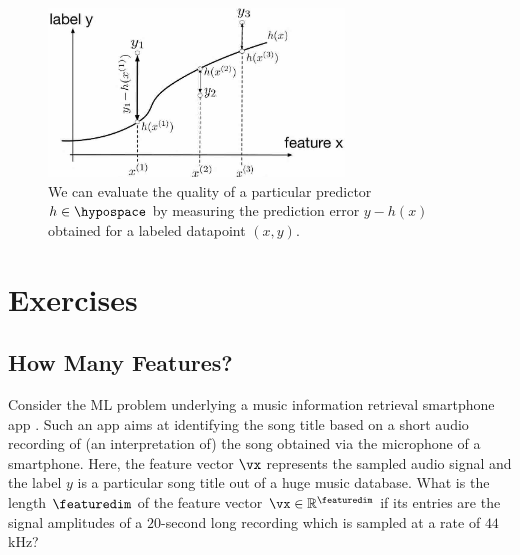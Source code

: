 \documentclass[12pt]{report}
\begin{document}
\begin{figure}[htbp]
    \centering
   \includegraphics[width=0.7\textwidth]{EmpError.jpg}  
    \caption{We can evaluate the quality of a particular predictor $h \in \hypospace$ by measuring the 
    prediction error $y- h(x)$ obtained for a labeled datapoint $(x,y)$. }
  \label{fig_emp_error}
\end{figure}

\newpage
\section{Exercises} 

\subsection{ How Many Features?} 
\label{ex_compML_shazaam}
Consider the ML problem underlying a music information retrieval smartphone 
app \cite{ShazamPaper}. Such an app aims at identifying the song title based 
on a short audio recording of (an interpretation of) the song obtained via the 
microphone of a smartphone. Here, the feature vector $\vx$ represents the 
sampled audio signal and the label $y$ is a particular song title out of a huge 
music database. What is the length $\featuredim$ of the feature vector 
$\vx \in \mathbb{R}^{\featuredim}$ if its entries are the signal amplitudes of 
a $20$-second long recording which is sampled at a rate of $44$ kHz?
\end{document}
